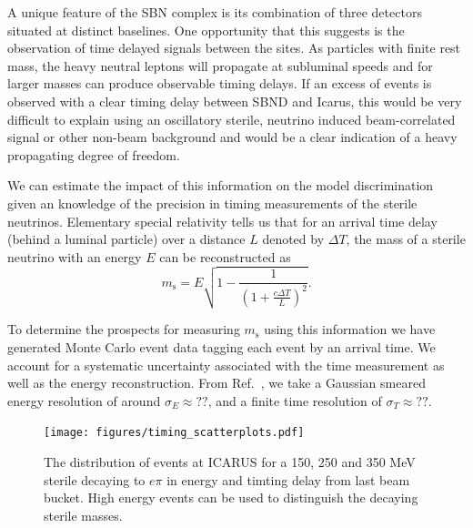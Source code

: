 \documentclass[11pt, a4paper]{article}
\newcommand{\refref}[1]{Ref.~\cite{#1}}
\def\icarus{Icarus}
\begin{document}
A unique feature of the SBN complex is its combination of three detectors
situated at distinct baselines. One opportunity that this suggests is the
observation of time delayed signals between the sites. As particles with finite
rest mass, the heavy neutral leptons will propagate at subluminal speeds and
for larger masses can produce observable timing delays. If an excess of events
is observed with a clear timing delay between SBND and \icarus, this would be
very difficult to explain using an oscillatory sterile, neutrino induced
beam-correlated signal or other non-beam background and would be a clear
indication of a heavy propagating degree of freedom. 

We can estimate the impact of this information on the model discrimination
given an knowledge of the precision in timing measurements of the sterile
neutrinos. Elementary special relativity tells us that for an arrival time delay (behind a luminal particle) over a distance $L$ denoted by $\Delta T$, the mass of a sterile neutrino with an energy $E$ can be reconstructed as 
%
%
\[ m_\text{s} = E\sqrt{1-\frac{1}{\left(1+\frac{c\Delta T}{L}\right)^2}}. \]

To determine the prospects for measuring $m_\text{s}$ using this information we
have generated Monte Carlo event data tagging each event by an arrival time.
We account for a systematic uncertainty associated with the time measurement as
well as the energy reconstruction. From \refref{WHERE}, we take a Gaussian
smeared energy resolution of around $\sigma_E \approx ??$, and a finite time
resolution of $\sigma_T  \approx ??$. \\


\begin{figure}[t]
\center
\texttt{[image: figures/timing\_scatterplots.pdf]}
\caption{\label{fig:tof_scatter} The distribution of events at ICARUS for a 150, 250 and 350 MeV sterile decaying to $e \pi$ in energy and timting delay from last beam bucket. High energy events can be used to distinguish the decaying sterile masses.}
\end{figure}


\end{document}
